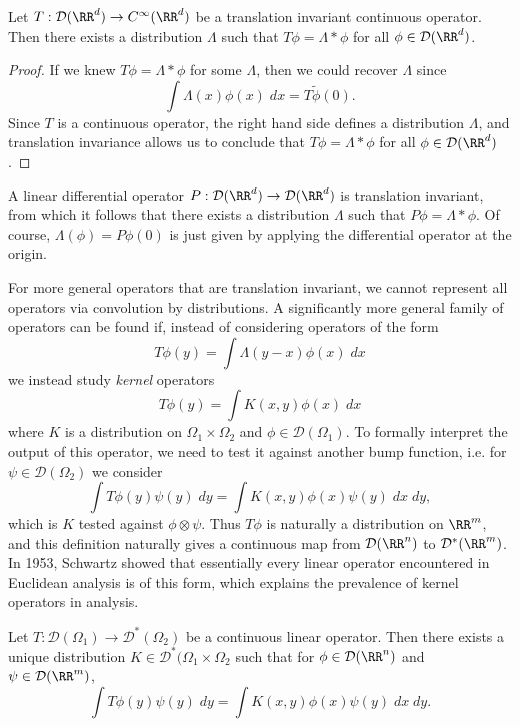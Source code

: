 \begin{theorem}
  Let $T: \mathcal{D}(\RR^d) \to C^\infty(\RR^d)$ be a translation invariant continuous operator. Then there exists a distribution $\Lambda$ such that $T\phi = \Lambda * \phi$ for all $\phi \in \mathcal{D}(\RR^d)$.
\end{theorem}
\begin{proof}
  If we knew $T\phi = \Lambda * \phi$ for some $\Lambda$, then we could recover $\Lambda$ since
  \[ \int \Lambda(x) \phi(x)\; dx = T \tilde{\phi}(0). \]
  Since $T$ is a continuous operator, the right hand side defines a distribution $\Lambda$, and translation invariance allows us to conclude that $T\phi = \Lambda * \phi$ for all $\phi \in \mathcal{D}(\RR^d)$.
\end{proof}

\begin{example}
        A linear differential operator $P: \mathcal{D}(\RR^d) \to \mathcal{D}(\RR^d)$ is translation invariant, from which it follows that there exists a distribution $\Lambda$ such that $P\phi = \Lambda * \phi$. Of course, $\Lambda(\phi) = P\phi(0)$ is just given by applying the differential operator at the origin.
\end{example}

For more general operators that are translation invariant, we cannot represent all operators via convolution by distributions. A significantly more general family of operators can be found if, instead of considering operators of the form
%
\[ T\phi(y) = \int \Lambda(y - x) \phi(x)\; dx \]
%
we instead study \emph{kernel} operators
%
\[ T\phi(y) = \int K(x,y) \phi(x)\; dx \]
%
where $K$ is a distribution on $\Omega_1 \times \Omega_2$ and $\phi \in \mathcal{D}(\Omega_1)$. To formally interpret the output of this operator, we need to test it against another bump function, i.e. for $\psi \in \mathcal{D}(\Omega_2)$ we consider
%
\[ \int T\phi(y) \psi(y)\; dy = \int K(x,y) \phi(x) \psi(y)\; dx\; dy, \]
%
which is $K$ tested against $\phi \otimes \psi$. Thus $T\phi$ is naturally a distribution on $\RR^m$, and this definition naturally gives a continuous map from $\mathcal{D}(\RR^n)$ to $\mathcal{D}^*(\RR^m)$. In 1953, Schwartz showed that essentially every linear operator encountered in Euclidean analysis is of this form, which explains the prevalence of kernel operators in analysis.

\begin{theorem}
  Let $T: \mathcal{D}(\Omega_1) \to \mathcal{D}^*(\Omega_2)$ be a continuous linear operator. Then there exists a unique distribution $K \in \mathcal{D}^*(\Omega_1 \times \Omega_2$ such that for $\phi \in \mathcal{D}(\RR^n)$ and $\psi \in \mathcal{D}(\RR^m)$,
  \[ \int T\phi(y) \psi(y)\; dy = \int K(x,y) \phi(x) \psi(y)\; dx\; dy. \]
\end{theorem}


